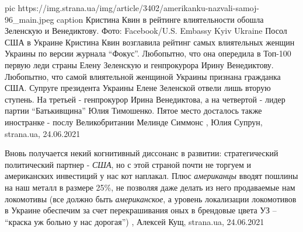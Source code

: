 \ifcmt
  pic https://img.strana.ua/img/article/3402/amerikanku-nazvali-samoj-96_main.jpeg
	caption Кристина Квин в рейтинге влиятельности обошла Зеленскую и Венедиктову. Фото: Facebook/U.S. Embassy Kyiv Ukraine 
\fi
Посол США в Украине Кристина Квин возглавила рейтинг самых влиятельных женщин
Украины по версии журнала \enquote{Фокус}. Любопытно, что она опередила в Топ-100
первую леди страны Елену Зеленскую и генпрокурора Ирину Венедиктову.
Любопытно, что самой влиятельной женщиной Украины признана гражданка США.
Супруге президента  Украины Елене Зеленской отвели лишь вторую ступень.  На
третьей - генпрокурор Ирина Венедиктова, а на четвертой - лидер партии
\enquote{Батькивщина} Юлия Тимошенко. Пятое место досталось также иностранке - послу
Великобритании Мелинде Симмонс
 , Юлия Супрун, strana.ua, 24.06.2021

Вновь получается некий когнитивный диссонанс в развитии: стратегический
политический партнер - \emph{США}, но с этой страной почти не торгуем и американских
инвестиций у нас кот наплакал.  Плюс \emph{американцы} вводят пошлины на наш металл в
размере 25\%, не позволяя даже делать из него продаваемые нам локомотивы (все
должно быть \emph{американское}, а уровень локализации локомотивов в Украине обеспечим
за счет перекрашивания оных в брендовые цвета УЗ – \enquote{краска уж больно у нас
дорогая})
,
Алексей Кущ, strana.ua, 24.06.2021


